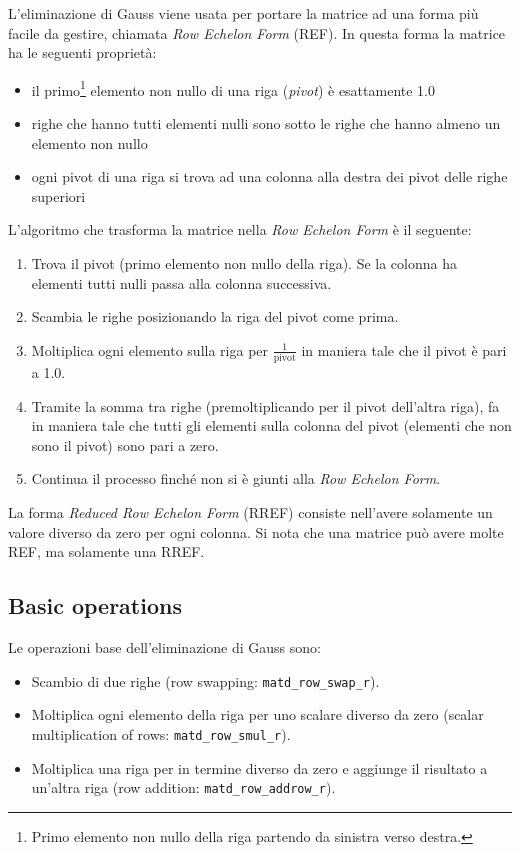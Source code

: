 \documentclass[10pt]{article}
\begin{document}
L'eliminazione di Gauss viene usata per portare la matrice ad una forma più facile da gestire, chiamata \textit{Row Echelon Form} (REF). In questa forma la matrice ha le seguenti proprietà:
\begin{itemize}[noitemsep]
\item il primo\footnote{Primo elemento non nullo della riga partendo da sinistra verso destra.} elemento non nullo di una riga (\emph{pivot}) è esattamente 1.0
\item righe che hanno tutti elementi nulli sono sotto le righe che hanno almeno un elemento non nullo
\item ogni pivot di una riga si trova ad una colonna alla destra dei pivot delle righe superiori
\end{itemize}
L'algoritmo che trasforma la matrice nella \textit{Row Echelon Form} è il seguente:
\begin{enumerate}[noitemsep]
\item Trova il pivot (primo elemento non nullo della riga). Se la colonna ha elementi tutti nulli passa alla colonna successiva.
\item Scambia le righe posizionando la riga del pivot come prima.
\item Moltiplica ogni elemento sulla riga per $\frac{1}{\text{pivot}}$ in maniera tale che il pivot è pari a 1.0.
\item Tramite la somma tra righe (premoltiplicando per il pivot dell'altra riga), fa in maniera tale che tutti gli elementi sulla colonna del pivot (elementi che non sono il pivot) sono pari a zero.
\item Continua il processo finché non si è giunti alla \textit{Row Echelon Form}.
\end{enumerate}

La forma \textit{Reduced Row Echelon Form} (RREF) consiste nell'avere solamente un valore diverso da zero per ogni colonna.
Si nota che una matrice può avere molte REF, ma solamente una RREF.


\subsection{Basic operations}

Le operazioni base dell'eliminazione di Gauss sono:
\begin{itemize}[noitemsep]
\item Scambio di due righe (row swapping: \verb|matd_row_swap_r|).
\item Moltiplica ogni elemento della riga per uno scalare diverso da zero (scalar multiplication of rows: \verb|matd_row_smul_r|).
\item Moltiplica una riga per in termine diverso da zero e aggiunge il risultato a un'altra riga (row addition: \verb|matd_row_addrow_r|).
\end{itemize}
\end{document}
